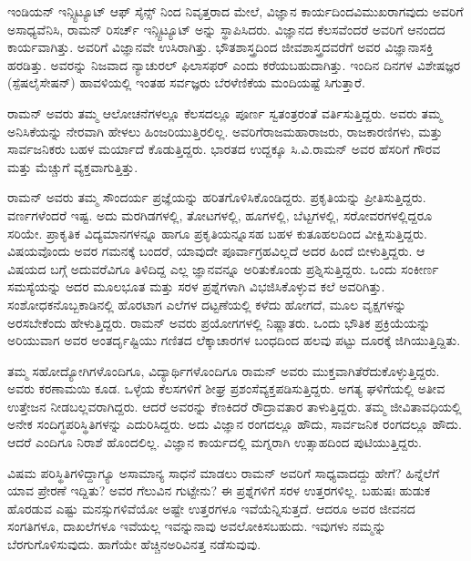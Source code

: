 ಇಂಡಿಯನ್ ಇನ್ಸ್ಟಿಟ್ಯೂಟ್ ಆಫ್‌ ಸೈನ್ಸ್ ನಿಂದ ನಿವೃತ್ತರಾದ ಮೇಲೆ, ವಿಜ್ಞಾನ ಕಾರ್ಯದಿಂದ\break ವಿಮುಖರಾಗವುದು ಅವರಿಗೆ ಅಸಾಧ್ಯವೆನಿಸಿ, ರಾಮನ್ ರಿಸರ್ಚ್ ಇನ್ಸ್ಟಿಟ್ಯೂಟ್ ಅನ್ನು ಸ್ಥಾಪಿಸಿದರು. ವಿಜ್ಞಾನದ ಕೆಲಸವೆಂದರೆ ಅವರಿಗೆ ಆನಂದದ ಕಾರ್ಯವಾಗಿತ್ತು. ಅವರಿಗೆ ವಿಜ್ಞಾನವೇ ಉಸಿರಾಗಿತ್ತು. ಭೌತಶಾಸ್ತ್ರದಿಂದ ಜೀವಶಾಸ್ತ್ರದವರೆಗೆ ಅವರ ವಿಜ್ಞಾನಾಸಕ್ತಿ ಹರಡಿತ್ತು. ಅವರನ್ನು ನಿಜವಾದ ನ್ಯಾಚುರಲ್ ಫಿಲಾಸಫರ್ ಎಂದು ಕರೆಯಬಹುದಾಗಿತ್ತು. ಇಂದಿನ ದಿನಗಳ ವಿಶೇಷಜ್ಞರ (ಸ್ಪೆಷಲೈಸೇಷನ್) ಹಾವಳಿಯಲ್ಲಿ ಇಂತಹ ಸರ್ವಜ್ಞರು ಬೆರಳೆಣಿಕೆಯ ಮಂದಿಯಷ್ಟೆ  ಸಿಗುತ್ತಾರೆ.


ರಾಮನ್ ಅವರು ತಮ್ಮ ಆಲೋಚನೆಗಳಲ್ಲೂ ಕೆಲಸದಲ್ಲೂ ಪೂರ್ಣ ಸ್ವತಂತ್ರರಂತೆ ವರ್ತಿಸು\break  ತ್ತಿದ್ದರು. ಅವರು ತಮ್ಮ ಅನಿಸಿಕೆಯನ್ನು ನೇರವಾಗಿ ಹೇಳಲು ಹಿಂಜರಿಯುತ್ತಿರಲಿಲ್ಲ. ಅವರಿಗೆ\break ರಾಜಮಹಾರಾಜರು, ರಾಜಕಾರಣಿಗಳು, ಮತ್ತು ಸಾರ್ವಜನಿಕರು ಬಹಳ ಮರ್ಯಾದೆ ಕೊಡುತ್ತಿದ್ದರು. ಭಾರತದ ಉದ್ದಕ್ಕೂ ಸಿ.ವಿ.ರಾಮನ್ ಅವರ ಹೆಸರಿಗೆ ಗೌರವ ಮತ್ತು ಮೆಚ್ಚುಗೆ ವ್ಯಕ್ತವಾಗುತ್ತಿತ್ತು.

ರಾಮನ್ ಅವರು ತಮ್ಮ ಸೌಂದರ್ಯ ಪ್ರಜ್ಞೆಯನ್ನು ಹರಿತಗೊಳಿಸಿಕೊಂಡಿದ್ದರು. ಪ್ರಕೃತಿಯನ್ನು ಪ್ರೀತಿಸುತ್ತಿದ್ದರು. ವರ್ಣಗಳೆಂದರೆ ಇಷ್ಟ. ಅದು ಮರಗಿಡಗಳಲ್ಲಿ, ತೋಟಗಳಲ್ಲಿ, ಹೂಗಳಲ್ಲಿ, ಬೆಟ್ಟಗಳಲ್ಲಿ, ಸರೋವರಗಳಲ್ಲಿದ್ದರೂ ಸರಿಯೇ. ಪ್ರಾಕೃತಿಕ ವಿದ್ಯಮಾನಗಳನ್ನೂ ಹಾಗೂ ಪ್ರಕೃತಿಯನ್ನೂ\break ಸಹ ಬಹಳ ಕುತೂಹಲದಿಂದ ವೀಕ್ಷಿಸುತ್ತಿದ್ದರು. ವಿಷಯವೊಂದು ಅವರ ಗಮನಕ್ಕೆ ಬಂದರೆ, ಯಾವುದೇ ಪೂರ್ವಾಗ್ರಹವಿಲ್ಲದೆ ಅದರ ಹಿಂದೆ ಬೀಳುತ್ತಿದ್ದರು. ಆ ವಿಷಯದ ಬಗ್ಗೆ ಅದುವರೆವಿಗೂ ತಿಳಿದಿದ್ದ ಎಲ್ಲ ಜ್ಞಾನವನ್ನೂ ಅರಿತುಕೊಂಡು ಪ್ರಶ್ನಿಸುತ್ತಿದ್ದರು. ಒಂದು ಸಂಕೀರ್ಣ ಸಮಸ್ಯೆಯನ್ನು ಅದರ ಮೂಲಭೂತ ಮತ್ತು ಸರಳ ಪ್ರಶ್ನೆಗಳಾಗಿ ವಿಭಜಿಸಿಕೊಳ್ಳುವ ಕಲೆ ಅವರಿಗಿತ್ತು. ಸಂಶೋಧಕನೊಬ್ಬ\break ಕಾಡಿನಲ್ಲಿ ಹೊರಟಾಗ ಎಲೆಗಳ ದಟ್ಟಣೆಯಲ್ಲಿ ಕಳೆದು ಹೋಗದೆ, ಮೂಲ ವೃಕ್ಷಗಳನ್ನು ಅರಸ\break ಬೇಕೆಂದು ಹೇಳುತ್ತಿದ್ದರು. ರಾಮನ್ ಅವರು ಪ್ರಯೋಗಗಳಲ್ಲಿ ನಿಷ್ಣಾತರು. ಒಂದು ಭೌತಿಕ ಪ್ರಕ್ರಿಯೆಯನ್ನು ಅರಿಯುವಾಗ ಅವರ ಅಂತರ್ದೃಷ್ಟಿಯು ಗಣಿತದ ಲೆಕ್ಕಾಚಾರಗಳ ಬಂಧದಿಂದ ಹಲವು ಪಟ್ಟು ದೂರಕ್ಕೆ ಜಿಗಿಯುತ್ತಿದ್ದಿತು.


ತಮ್ಮ ಸಹೋದ್ಯೋಗಿಗಳೊಂದಿಗೂ, ವಿದ್ಯಾರ್ಥಿಗಳೊಂದಿಗೂ ರಾಮನ್ ಅವರು ಮುಕ್ತವಾಗಿ\break ತೆರೆದುಕೊಳ್ಳುತ್ತಿದ್ದರು. ಅವರು ಕರಣಾಮಯಿ ಕೂಡ. ಒಳ್ಳೆಯ ಕೆಲಸಗಳಿಗೆ ಶೀಘ್ರ ಪ್ರಶಂಸೆ\break ವ್ಯಕ್ತಪಡಿಸುತ್ತಿದ್ದರು. ಅಗತ್ಯ ಘಳಿಗೆಯಲ್ಲಿ ಅತೀವ ಉತ್ತೇಜನ ನೀಡಬಲ್ಲವರಾಗಿದ್ದರು. ಆದರೆ ಅವರನ್ನು ಕೆಣಕಿದರೆ ರೌದ್ರಾವತಾರ ತಾಳುತ್ತಿದ್ದರು. ತಮ್ಮ ಜೀವಿತಾವಧಿಯಲ್ಲಿ ಅನೇಕ ಸಂದಿಗ್ಧ\break ಪರಿಸ್ಥಿತಿಗಳನ್ನು ಎದುರಿಸಿದ್ದರು. ಅದು ವಿಜ್ಞಾನ ರಂಗದಲ್ಲೂ ಹೌದು, ಸಾರ್ವಜನಿಕ ರಂಗದಲ್ಲೂ ಹೌದು. ಆದರೆ ಎಂದಿಗೂ ನಿರಾಶೆ ಹೊಂದಲಿಲ್ಲ. ವಿಜ್ಞಾನ ಕಾರ್ಯದಲ್ಲಿ ಮಗ್ನರಾಗಿ ಉತ್ಸಾಹದಿಂದ ಪುಟಿಯುತ್ತಿದ್ದರು. 

\medskip

ವಿಷಮ ಪರಿಸ್ಥಿತಿಗಳಿದ್ದಾಗ್ಯೂ ಅಸಾಮಾನ್ಯ ಸಾಧನೆ ಮಾಡಲು  ರಾಮನ್ ಅವರಿಗೆ ಸಾಧ್ಯ\break ವಾದದ್ದು ಹೇಗೆ? ಹಿನ್ನೆಲೆಗೆ ಯಾವ ಪ್ರೇರಣೆ ಇದ್ದಿತು? ಅವರ ಗೆಲುವಿನ ಗುಟ್ಟೇನು? ಈ ಪ್ರಶ್ನೆಗಳಿಗೆ ಸರಳ ಉತ್ತರಗಳಿಲ್ಲ. ಬಹುಷಃ ಹುಡುಕ ಹೊರಡುವ ಎಷ್ಟು ಮನಸ್ಸುಗಳಿವೆಯೋ ಅಷ್ಟೇ ಉತ್ತರಗಳೂ ಇವೆಯೆನ್ನಿಸುತ್ತದೆ. ಆದರೂ ಅವರ ಜೀವನದ ಸಂಗತಿಗಳೂ, ದಾಖಲೆಗಳೂ ಇವೆಯಲ್ಲ \enginline{-}ಇವನ್ನು\break ನಾವು ಅವಲೋಕಿಸಬಹುದು. ಇವುಗಳು ನಮ್ಮನ್ನು ಬೆರಗುಗೊಳಿಸುವುದು. ಹಾಗೆಯೇ ಹೆಚ್ಚಿನ\break ಅರಿವಿನತ್ತ ನಡೆಸುವುವು.

